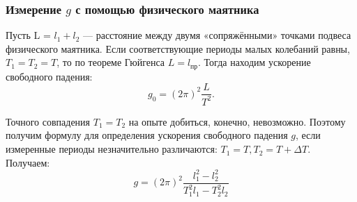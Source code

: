 \documentclass[a4paper, 12pt]{article}
\begin{document}
\bigskip

\begin{center}
    
\subsubsection*{Измерение $g$ с помощью физического маятника} 

Пусть L = $l_{1} + l_{2}$ — расстояние между двумя «сопряжёнными» точками подвеса физического маятника. Если соответствующие периоды малых колебаний равны, $T_{1} = T_{2} = T$, то по теореме Гюйгенса $L = l_{\text{пр}}$. Тогда находим ускорение свободного падения:
$$g_{0} = (2\pi)^2\frac{L}{T^2}.$$

Точного совпадения $T_{1} = T_{2}$ на опыте добиться, конечно, невозможно. 
Поэтому получим формулу для определения ускорения свободного падения $g$, если измеренные периоды незначительно различаются: $T_{1} = T, T_{2} =
T + \varDelta T$. Получаем:
$$g = (2\pi)^2\frac{l_{1}^2-l_{2}^2}{T_{1}^2l_{1} - T_{2}^2l_{2}}$$

\end{center}
\end{document}
